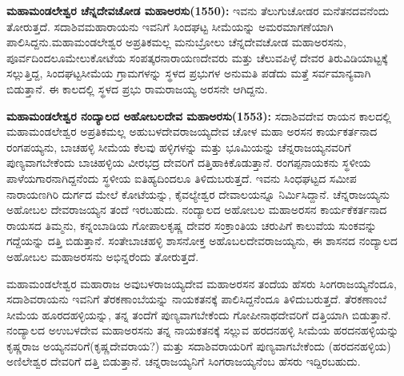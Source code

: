 \textbf{ಮಹಾಮಂಡಲೇಶ್ವರ ಚೆನ್ನದೇವಚೋಡ ಮಹಾಅರಸು(1550):} ಇವನು ತೆಲುಗುಚೋಡರ ಮನೆತನದವನೆಂದು ತೋರು\-ತ್ತದೆ. ಸದಾಶಿವಮಹಾರಾಯನು ಇವನಿಗೆ ಸಿಂದಘಟ್ಟ ಸೀಮೆಯನ್ನು ಅಮರಮಾಗಣೆಯಾಗಿ ಪಾಲಿಸಿದ್ದನು.\break ಮಹಾಮಂಡಲೇಶ್ವರ ಅಪ್ರತಿಕಮಲ್ಲ ಮನುಬ್ರೋಲು ಚೆನ್ನದೇವಚೋಡ ಮಹಾಅರಸನು, ಪೂರ್ವದಿಂದಲೂ\break ಮೇಲುಕೋಟೆಯ ಸಂಪತ್ಕರನಾರಾಯಣದೇವರು ಮತ್ತು ಚೆಲುವಪಿಳ್ಳೆ ದೇವರ ತಿರುವಿಡಿಯಾಟ್ಟಕ್ಕೆ ಸಲ್ಲುತ್ತಿದ್ದ, ಸಿಂದಘಟ್ಟ\-ಸೀಮೆಯ ಗ್ರಾಮಗಳನ್ನು ಸ್ಥಳದ ಪ್ರಭುಗಳ ಅನುಮತಿ ಪಡೆದು ಮತ್ತೆ ಸರ್ವಮಾನ್ಯವಾಗಿ ಬಿಡುತ್ತಾನೆ. ಈ ಕಾಲದಲ್ಲಿ ಸ್ಥಳದ ಪ್ರಭು ರಾಮರಾಜಯ್ಯ ಅರಸನೇ ಆಗಿದ್ದನು.

\textbf{ಮಹಾಮಂಡಲೇಶ್ವರ ನಂದ್ಯಾಲದ ಅಹೋಬಲದೇವ ಮಹಾಅರಸು(1553):} ಸದಾಶಿವದೇವ ರಾಯನ ಕಾಲದಲ್ಲಿ ಮಹಾಮಂಡಲೇಶ್ವರ ಅಪ್ರತಿಕಮಲ್ಲ ಅಹುಬಳದೇವರಾಜಯ್ಯದೇವ ಚೋಳ ಮಹಾ ಅರಸನ ಕಾರ್ಯಕರ್ತನಾದ ರಂಗಪಯ್ಯನು, ಬಾಚಹಳ್ಳಿ ಸೀಮೆಯ ಕೆಲವು ಹಳ್ಳಿಗಳನ್ನು ಮತ್ತು ಭೂಮಿಯನ್ನು ಚೆನ್ನರಾಜಯ್ಯನವರಿಗೆ ಪುಣ್ಯವಾಗಬೇಕೆಂದು ಬಾಚಿಹಳ್ಳಿಯ ವೀರಭದ್ರ ದೇವರಿಗೆ ದತ್ತಿಹಾಕಿಕೊಡುತ್ತಾನೆ. ರಂಗಪ್ಪನಾಯಕನು ಸ್ಥಳೀಯ ಪಾಳೆಯಗಾರನಾಗಿದ್ದನೆಂದು ಸ್ಥಳೀಯ ಐತಿಹ್ಯದಿಂದಲೂ ತಿಳಿದುಬರುತ್ತದೆ. ಇವನು ಸಿಂಧಘಟ್ಟದ ಸಮೀಪ ನಾರಾಯಣಗಿರಿ ದುರ್ಗದ ಮೇಲೆ ಕೋಟೆಯನ್ನು, ಕೈವಲ್ಯೇಶ್ವರ ದೇವಾಲಯನ್ನೂ ನಿರ್ಮಿಸಿದ್ದಾನೆ. ಚೆನ್ನರಾಜಯ್ಯನು ಅಹೋಬಲ ದೇವರಾಜಯ್ಯನ ತಂದೆ ಇರಬಹುದು. ನಂದ್ಯಾಲದ ಅಹೋಬಲ ಮಹಾಅರಸನ ಕಾರ್ಯಕೆಕರ್ತನಾದ ರಾಯಸದ ತಿಮ್ಮನು, ಕನ್ನಂಬಾಡಿಯ ಗೋಪಾಲಕೃಷ್ಣ ದೇವರ ಸಂಕ್ರಾಂತಿಯ ಚರುಪಿಗೆ ಕಾಲುವೆಯ ಸುಂಕವನ್ನು ಗದ್ದೆಯನ್ನು ದತ್ತಿ ಬಿಡುತ್ತಾನೆ. ಸಂತೇಬಾಚಹಳ್ಳಿ ಶಾಸನೋಕ್ತ ಅಹೊಬಲದೇವರಾಜಯ್ಯನು, ಈ ಶಾಸನದ ನಂದ್ಯಾಲದ ಅಹೋಬಲ ಮಹಾಅರಸನು ಅಭಿನ್ನರೆಂದು ತೋರುತ್ತದೆ.

ಮಹಾಮಂಡಲೇಶ್ವರ ಮಹಾರಾಜ ಅವುಬಳರಾಜಯ್ಯದೇವ ಮಹಾಅರಸನ ತಂದೆಯ ಹೆಸರು ಸಿಂಗರಾಜಯ್ಯ\-ನೆಂದೂ, ಸದಾಶಿವರಾಯನು ಇವನಿಗೆ ತೆರಕಣಾಂಬೆಯನ್ನು ನಾಯಕತನಕ್ಕೆ ಪಾಲಿಸಿದ್ದನೆಂದೂ ತಿಳಿದುಬರುತ್ತದೆ. ತೆರಕಣಾಂಬೆ ಸೀಮೆಯ ಹೂರದಹಳ್ಳಿಯನ್ನು, ತನ್ನ ತಂದೆಗೆ ಪುಣ್ಯವಾಗಬೇಕೆಂದು ಗೋಪೀನಾಥದೇವರಿಗೆ ದತ್ತಿಯಾಗಿ ಬಿಡುತ್ತಾನೆ. ನಂದ್ಯಾಲದ ಅಉಬಳದೇವ ಮಹಾಅರಸನು ತನ್ನ ನಾಯಕತನಕ್ಕೆ ಸಲ್ಲುವ ಹರದನಹಳ್ಳಿ ಸೀಮೆಯ ಹರದನಹಳ್ಳಿಯನ್ನು ಕೃಷ್ಣರಾಜ ಅಯ್ಯನವರಿಗೆ(ಕೃಷ್ಣದೇವರಾಯ?) ಮತ್ತು ಸದಾಶಿವರಾಯರಿಗೆ ಪುಣ್ಯವಾಗಬೇಕೆಂದು (ಹರದನಹಳ್ಳಿಯ) ಅಣಿಲೇಶ್ವರ ದೇವರಿಗೆ ದತ್ತಿ ಬಿಡುತ್ತಾನೆ. ಚನ್ನರಾಜಯ್ಯನಿಗೆ ಸಿಂಗರಾಜಯ್ಯನೆಂಬ ಹೆಸರು ಇದ್ದಿರಬಹುದು.


